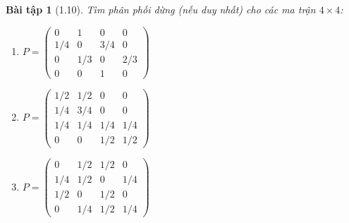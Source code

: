 \documentclass[8pt,a4paper]{article}
\newtheorem{exercise}{Bài tập}
\begin{document}
\begin{exercise}[1.10]
Tìm phân phối dừng (nếu duy nhất) cho các ma trận $4\times 4$:
\begin{enumerate}[label=(\alph*)]
\item $P = \begin{pmatrix} 0 & 1 & 0 & 0 \\ 1/4 & 0 & 3/4 & 0 \\ 0 & 1/3 & 0 & 2/3 \\ 0 & 0 & 1 & 0 \end{pmatrix}$
\item $P = \begin{pmatrix} 1/2 & 1/2 & 0 & 0 \\ 1/4 & 3/4 & 0 & 0 \\ 1/4 & 1/4 & 1/4 & 1/4 \\ 0 & 0 & 1/2 & 1/2 \end{pmatrix}$
\item $P = \begin{pmatrix} 0 & 1/2 & 1/2 & 0 \\ 1/4 & 1/2 & 0 & 1/4 \\ 1/2 & 0 & 1/2 & 0 \\ 0 & 1/4 & 1/2 & 1/4 \end{pmatrix}$
\end{enumerate}
\end{exercise}
\end{document}
